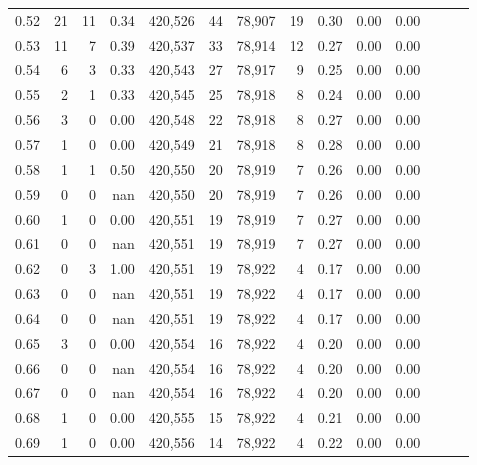 \begin{tabular}{rrrrrrrrrrrrrr}
0.52 &      21 &     11 &  0.34 &  420,526 &       44 &  78,907 &      19 &  0.30 &  0.00 &      0.00 \\
0.53 &      11 &      7 &  0.39 &  420,537 &       33 &  78,914 &      12 &  0.27 &  0.00 &      0.00 \\
0.54 &       6 &      3 &  0.33 &  420,543 &       27 &  78,917 &       9 &  0.25 &  0.00 &      0.00 \\
0.55 &       2 &      1 &  0.33 &  420,545 &       25 &  78,918 &       8 &  0.24 &  0.00 &      0.00 \\
0.56 &       3 &      0 &  0.00 &  420,548 &       22 &  78,918 &       8 &  0.27 &  0.00 &      0.00 \\
0.57 &       1 &      0 &  0.00 &  420,549 &       21 &  78,918 &       8 &  0.28 &  0.00 &      0.00 \\
0.58 &       1 &      1 &  0.50 &  420,550 &       20 &  78,919 &       7 &  0.26 &  0.00 &      0.00 \\
0.59 &       0 &      0 &   nan &  420,550 &       20 &  78,919 &       7 &  0.26 &  0.00 &      0.00 \\
0.60 &       1 &      0 &  0.00 &  420,551 &       19 &  78,919 &       7 &  0.27 &  0.00 &      0.00 \\
0.61 &       0 &      0 &   nan &  420,551 &       19 &  78,919 &       7 &  0.27 &  0.00 &      0.00 \\
0.62 &       0 &      3 &  1.00 &  420,551 &       19 &  78,922 &       4 &  0.17 &  0.00 &      0.00 \\
0.63 &       0 &      0 &   nan &  420,551 &       19 &  78,922 &       4 &  0.17 &  0.00 &      0.00 \\
0.64 &       0 &      0 &   nan &  420,551 &       19 &  78,922 &       4 &  0.17 &  0.00 &      0.00 \\
0.65 &       3 &      0 &  0.00 &  420,554 &       16 &  78,922 &       4 &  0.20 &  0.00 &      0.00 \\
0.66 &       0 &      0 &   nan &  420,554 &       16 &  78,922 &       4 &  0.20 &  0.00 &      0.00 \\
0.67 &       0 &      0 &   nan &  420,554 &       16 &  78,922 &       4 &  0.20 &  0.00 &      0.00 \\
0.68 &       1 &      0 &  0.00 &  420,555 &       15 &  78,922 &       4 &  0.21 &  0.00 &      0.00 \\
0.69 &       1 &      0 &  0.00 &  420,556 &       14 &  78,922 &       4 &  0.22 &  0.00 &      0.00 \\

\end{tabular}
